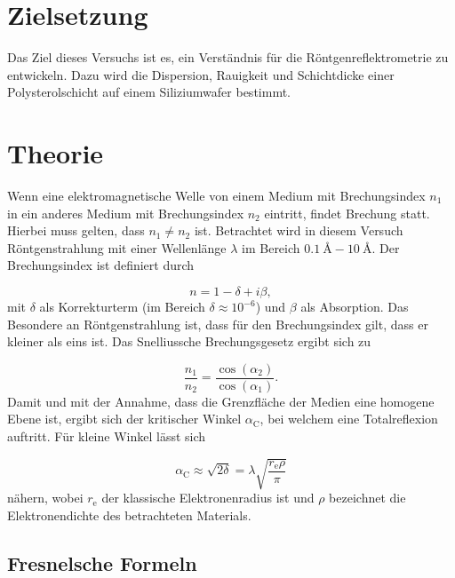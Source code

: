 \section{Zielsetzung}
\label{sec:Zielsetzung}

Das Ziel dieses Versuchs ist es, ein Verständnis für die Röntgenreflektrometrie zu entwickeln.
Dazu wird die Dispersion, Rauigkeit und Schichtdicke einer Polysterolschicht auf einem Siliziumwafer
bestimmt.


\section{Theorie}
\label{sec:Theorie}

Wenn eine elektromagnetische Welle von einem Medium mit Brechungsindex $n_1$ in ein anderes Medium mit 
Brechungsindex $n_2$ eintritt, findet Brechung statt. Hierbei muss gelten, dass $n_1 \neq n_2$ ist. 
Betrachtet wird in diesem Versuch Röntgenstrahlung mit einer Wellenlänge $\lambda$ im Bereich 
$\SI{0.1}{\angstrom}-\SI{10}{\angstrom}$. Der Brechungsindex ist definiert durch

\begin{equation*}
    n = 1-\delta +i\beta,
\end{equation*}
mit $\delta$ als Korrekturterm (im Bereich $\delta \approx 10^{-6}$) und $\beta$ als Absorption. 
Das Besondere an Röntgenstrahlung ist, dass für den Brechungsindex gilt, dass er kleiner als eins ist.
Das Snelliussche Brechungsgesetz ergibt sich zu

\begin{equation*}
    \frac{n_1}{n_2} = \frac{\cos{\left(\alpha_2\right)}}{\cos{\left(\alpha_1\right)}}.
\end{equation*}
Damit und mit der Annahme, dass die Grenzfläche der Medien eine homogene Ebene ist, ergibt sich der kritischer Winkel $\alpha_\text{C}$, 
bei welchem eine Totalreflexion auftritt. Für kleine Winkel lässt sich

\begin{equation*}
    \label{eqn:kritschwiknekl}
    \alpha_\text{C} \approx \sqrt{2\delta} = \lambda \sqrt{\frac{r_\text{e}\rho}{\pi}}
\end{equation*}
nähern, wobei $r_\text{e}$ der klassische Elektronenradius ist und $\rho$ bezeichnet die Elektronendichte des betrachteten Materials. 

\subsection{Fresnelsche Formeln}

